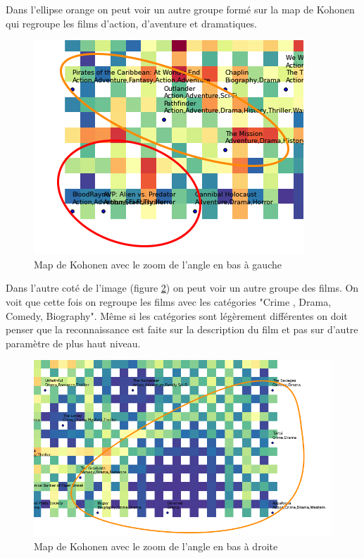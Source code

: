 Dans l'ellipse orange on peut voir un autre groupe formé sur la map de Kohonen qui regroupe les films d'action, d'aventure et dramatiques.

\begin{figure}[h]
	\centering
	\includegraphics[width=0.5\linewidth]{img/map1zoom2.png}
	\caption{Map de Kohonen avec le zoom de l'angle en bas à gauche}
	\label{map1zoom2}
\end{figure}

Dans l'autre coté de l'image (figure \ref{map1zoom3}) on peut voir un autre groupe des films. On voit que cette fois on regroupe les films avec les catégories "Crime , Drama, Comedy, Biography". Même si les catégories sont légèrement différentes on doit penser que la reconnaissance est faite sur la description du film et pas sur d'autre paramètre de plus haut niveau.

\begin{figure}[h]
\centering
\includegraphics[width=0.6\linewidth]{img/map1zoom3.png}
\caption{Map de Kohonen avec le zoom de l'angle en bas à droite}
\label{map1zoom3}
\end{figure}




